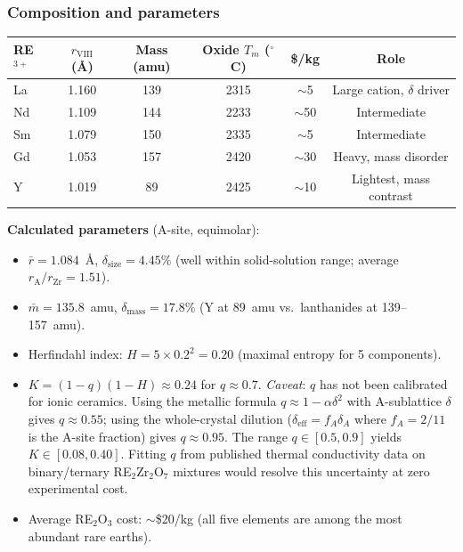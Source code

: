\documentclass[12pt,letterpaper]{article}
\theoremstyle{definition}
\begin{document}
\subsubsection{Composition and parameters}

\begin{center}
\small
\begin{tabular}{@{}lccccc@{}}
\toprule
RE$^{3+}$ & $r_{\mathrm{VIII}}$ (\AA) & Mass (amu) & Oxide $T_m$ ($^\circ$C) & \$/kg & Role \\
\midrule
La & 1.160 & 139 & 2315 & $\sim$5  & Large cation, $\delta$ driver \\
Nd & 1.109 & 144 & 2233 & $\sim$50 & Intermediate \\
Sm & 1.079 & 150 & 2335 & $\sim$5  & Intermediate \\
Gd & 1.053 & 157 & 2420 & $\sim$30 & Heavy, mass disorder \\
Y  & 1.019 &  89 & 2425 & $\sim$10 & Lightest, mass contrast \\
\bottomrule
\end{tabular}
\normalsize
\end{center}

\textbf{Calculated parameters} (A-site, equimolar):
\begin{itemize}
  \item $\bar{r} = 1.084$~\AA, \quad $\delta_{\mathrm{size}} = 4.45\%$ \quad (well within solid-solution range; average $r_{\mathrm{A}}/r_{\mathrm{Zr}} = 1.51$).
  \item $\bar{m} = 135.8$~amu, \quad $\delta_{\mathrm{mass}} = 17.8\%$ \quad (Y at 89~amu vs.\ lanthanides at 139--157~amu).
  \item Herfindahl index: $H = 5 \times 0.2^2 = 0.20$ \quad (maximal entropy for 5 components).
  \item $K = (1-q)(1-H) \approx 0.24$ \quad for $q \approx 0.7$.  \emph{Caveat}: $q$ has not been calibrated for ionic ceramics.  Using the metallic formula $q \approx 1 - \alpha\delta^2$ with A-sublattice $\delta$ gives $q \approx 0.55$; using the whole-crystal dilution ($\delta_{\mathrm{eff}} = f_A \delta_A$ where $f_A = 2/11$ is the A-site fraction) gives $q \approx 0.95$.  The range $q \in [0.5, 0.9]$ yields $K \in [0.08, 0.40]$.  Fitting $q$ from published thermal conductivity data on binary/ternary RE$_2$Zr$_2$O$_7$ mixtures would resolve this uncertainty at zero experimental cost.
  \item Average RE$_2$O$_3$ cost: $\sim$\$20/kg \quad (all five elements are among the most abundant rare earths).
\end{itemize}
\end{document}
